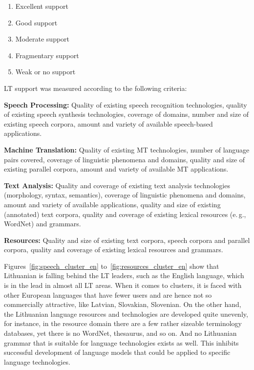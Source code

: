 \documentclass[]{../metanetpaper}
\begin{document}
\begin{multicols}{2}
\begin{enumerate}
\item Excellent support
\item Good support
\item Moderate support
\item Fragmentary support
\item Weak or no support
\end{enumerate}

LT support was measured according to the following criteria:

\textbf{Speech Processing:} Quality of existing speech recognition technologies, quality of existing speech synthesis technologies, coverage of domains, number and size of existing speech corpora, amount and variety of available speech-based applications.

\textbf{Machine Translation:} Quality of existing MT technologies, number of language pairs covered, coverage of linguistic phenomena and domains, quality and size of existing parallel corpora, amount and variety of available MT applications.

\textbf{Text Analysis:} Quality and coverage of existing text analysis technologies (morphology, syntax, semantics), coverage of linguistic phenomena and domains, amount and variety of available applications, quality and size of existing (annotated) text corpora, quality and coverage of existing lexical resources (e.\,g., WordNet) and grammars.

\textbf{Resources:} Quality and size of existing text corpora, speech corpora and parallel corpora, quality and coverage of existing lexical resources and grammars.

Figures~\ref{fig:speech_cluster_en} to~\ref{fig:resources_cluster_en} show that  Lithuanian is falling behind the LT leaders, such as the English language, which is in the lead in almost all LT areas. When it comes to clusters, it is faced with other European languages that have fewer users and are hence not so commercially attractive, like Latvian, Slovakian, Slovenian. On the other hand, the Lithuanian language resources and technologies are developed quite unevenly, for instance, in the resource domain there are a few rather sizeable terminology databases, yet there is no WordNet, thesaurus, and so on. And no Lithuanian grammar that is suitable for language technologies exists as well. This inhibits successful development of language models that could be applied to specific language technologies.


\end{multicols}
\end{document}
